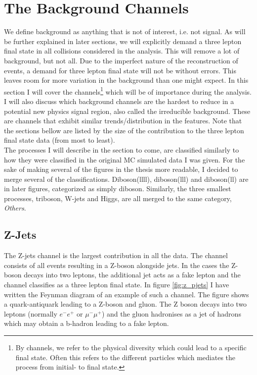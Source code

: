 \section{The Background Channels}\label{sec:bkg}
We define background as anything that is not of interest, i.e. not signal. 
As will be further explained in  later sections, we will explicitly demand a three lepton final state in all collisions 
considered in the analysis. This will remove a lot of background, but not all. Due to the imperfect nature of the 
reconstruction of events, a demand for three lepton final state will not be without errors. This leaves room for more 
variation in the background than one might expect. In this section I will cover the channels\footnote{By channels,
we refer to the physical diversity which could lead to a specific final state. Often this refers to 
the different particles which mediates the process from initial- to final state.} which will 
be of importance during the analysis. I will also discuss which background channels are the hardest 
to reduce in a potential new physics signal region, also called the irreducible background. These are 
channels that exhibit similar trends/distribution in the features. Note that the sections bellow
are listed by the size of the contribution to the three lepton final state data (from most to least).  
\\
The processes I will describe in the section to come, are classified similarly to how they were classified in the original 
\ac{MC} simulated data I was given. For the sake of making several of the figures in the thesis more readable, I decided 
to merge several of the classifications. Diboson(llll), diboson(lll) and diboson(ll) are in later figures, categorized as 
simply diboson. Similarly, the three smallest processes, triboson, W-jets and Higgs, are all merged to the same category, 
\emph{Others}.
\subsection*{Z-Jets}
The Z-jets channel is the largest contribution in all the data. The channel consists of all events
resulting in a Z-boson alongside jets. In the cases the Z-boson decays into two leptons, the additional 
jet acts as a fake lepton and the channel classifies as a three lepton final state. In figure \ref{fig:z_pjets} 
I have written the Feynman diagram of an example of such a channel. The figure shows a quark-antiquark leading 
to a Z-boson and gluon. The Z boson decays into two leptons (normally 
$e^-e^+$ or $\mu^- \mu^+$) and the gluon hadronises as a jet of hadrons which may obtain a b-hadron leading to a 
fake lepton. 

